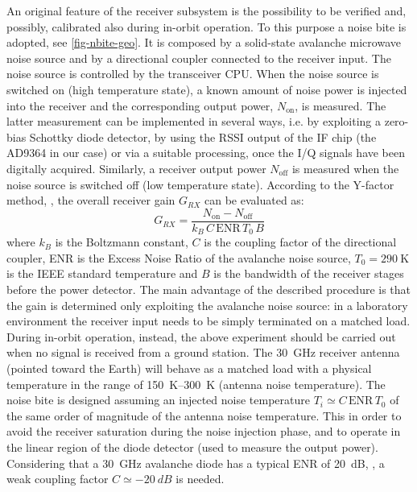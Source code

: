 \documentclass[conference,10pt,a4paper]{IEEEtran}%
\begin{document}
An original feature of the receiver subsystem is the possibility to be verified and, possibly, calibrated also during in-orbit operation.
To this purpose a noise \ac{bite} is adopted, see \cref{fig-nbite-geo}.
It is composed by a solid-state avalanche microwave noise source and by a directional coupler connected to the receiver input.
The noise source is controlled by the transceiver CPU.
When the noise source is switched on (high temperature state), a known amount of noise power is injected into the receiver and the corresponding output power, $N_\text{on}$, is measured.
The latter measurement can be implemented in several ways, i.e. by exploiting a zero-bias Schottky diode detector, by using the RSSI output of the IF chip (the AD9364 in our case) or via a suitable processing, once the I/Q signals have been digitally acquired.
Similarly, a receiver output power $N_\text{off}$ is measured when the noise source is switched off (low temperature state).
According to the Y-factor method, \cite{agilent_AN57-1, Alimenti2008}, the overall receiver gain $G_{RX}$ can be evaluated as:
\begin{equation}
   G_{RX} = \frac{N_\text{on} - N_\text{off}}{k_{B}\,C\,\textrm{ENR}\,T_{0}\,B}
   \label{eqn_RX_gain}
\end{equation}
where $k_{B}$ is the Boltzmann constant, $C$ is the coupling factor of the directional coupler, ENR is the Excess Noise Ratio of the avalanche noise source, $T_{0}=\SI{290}{\kelvin}$ is the IEEE standard temperature and $B$ is the bandwidth of the receiver stages before the power detector.
The main advantage of the described procedure is that the gain is determined only exploiting the avalanche noise source: in a laboratory environment the receiver input needs to be simply terminated on a matched load.
During in-orbit operation, instead, the above experiment should be carried out when no signal is received from a ground station.
The \SI{30}{\GHz} receiver antenna (pointed toward the Earth) will behave as a matched load with a physical temperature in the range of \SIrange{150}{300}{\kelvin} (antenna noise temperature).
The noise \ac{bite} is designed assuming an injected noise temperature $T_i \simeq C\,\text{ENR}\,T_{0}$ of the same order of magnitude of the antenna noise temperature.
This in order to avoid the receiver saturation during the noise injection phase, and to operate in the linear region of the diode detector (used to measure the output power).
Considering that a \SI{30}{GHz} avalanche diode has a typical ENR of \SI{20}{dB}, \cite{noisecom_NC407B,Alimenti2016}, a weak coupling factor $C \simeq \SI{-20}{dB}$ is needed.
\end{document}
